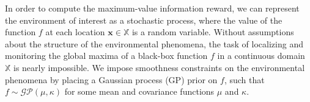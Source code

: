 \documentclass{styles/svproc}
\DeclareMathOperator*{\argmax}{arg\,max} %
\newcommand{\x}{\mathbf{x}}
\begin{document}



In order to compute the maximum-value information reward, we can represent the environment of interest as a stochastic process, where the value of the function $f$ at each location $\x \in \mathbb{X}$ is a random variable. Without assumptions about the structure of the environmental phenomena, the task of localizing and monitoring the global maxima of a black-box function $f$ in a continuous domain $\mathbb{X}$ is nearly impossible. We impose smoothness constraints on the environmental phenomena by placing a Gaussian process (GP) prior on $f$, such that $f \sim \mathcal{GP}(\mu, \kappa)$ for some mean and covariance functions $\mu$ and $\kappa$. 
\end{document}
